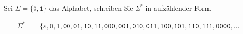 Sei $\Sigma = \{\texttt{0},\texttt{1}\}$ das Alphabet, schreiben
Sie $\Sigma^*$ in aufzählender Form.

\begin{loesung}
\begin{align*}
\Sigma^*
&=
\{\varepsilon, \texttt{0}, \texttt{1},
\texttt{00}, \texttt{01}, \texttt{10}, \texttt{11},
\texttt{000},
\texttt{001},
\texttt{010},
\texttt{011},
\texttt{100},
\texttt{101},
\texttt{110},
\texttt{111},
\texttt{0000},
\dots
\end{align*}
\end{loesung}

